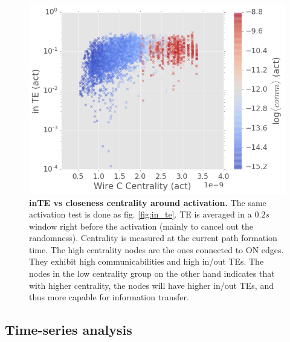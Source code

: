\documentclass[%
 reprint,
 amsmath,amssymb,
 aps,
]{revtex4-2}
\begin{document}
\begin{figure}[h]
	\centering
	\includegraphics[width=1\linewidth]{figure/TE_cent_act}
	\caption{\textbf{inTE vs closeness centrality around activation.} The same activation test is done as fig. \ref{fig:in_te}.	TE is averaged in a $0.2s$ window right before the activation (mainly to cancel out the randomness). Centrality is measured at the current path formation time. The high centrality nodes are the ones connected to ON edges. They exhibit high communicabilities and high in/out TEs. The nodes in the low centrality group on the other hand indicates that with higher centrality, the nodes will have higher in/out TEs, and thus more capable for information transfer.}
	\label{fig:TE_cent_act}
\end{figure}



\subsection{Time-series analysis}
\end{document}

